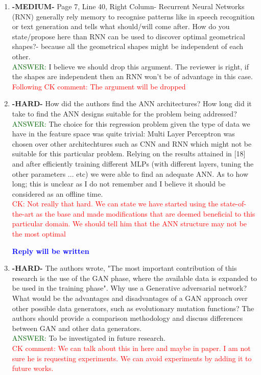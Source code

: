 \documentclass{article}
\newcommand{\reply}{\large \textcolor{blue}{ \textbf{Reply will be written} }}
\begin{document}
\begin{enumerate}
\item \textbf{-MEDIUM-} Page 7, Line 40, Right Column- Recurrent Neural Networks (RNN) generally rely memory to recognise patterns like in speech recognition or text generation and tells what should/will come after. How do you state/propose here than RNN can be used to discover optimal geometrical shapes?- because all the geometrical shapes might be independent of each other. \\
\textcolor{darkgreen}{ANSWER: } I believe we should drop this argument. The reviewer is right, if the shapes are independent then an RNN won't be of advantage in this case. \\

\textcolor{red}{Following CK comment: The argument will be dropped}

\item \textbf{-HARD-} How did the authors find the ANN architectures? How long did it take to find the ANN designs suitable for the problem being addressed? \\
\textcolor{darkgreen}{ANSWER: } The choice for this regression problem given the type of data we have in the feature space was quite trivial: Multi Layer Perceptron was chosen over other architechtures such as CNN and RNN which might not be suitable for this particular problem. Relying on the results attained in [18] and after efficiently training different MLPs (with different layers, tuning the other parameters ... etc) we were able to find an adequate ANN. As to how long; this is unclear as I do not remember and I believe it should be considered as an offline time.\\   

\textcolor{red}{CK: Not really that hard. We can state we have started using the state-of-the-art as the base and made modifications that are deemed beneficial to this particular domain. We should tell him that the ANN structure may not be the most optimal}

\reply

\item \textbf{-HARD-} The authors wrote, "The most important contribution of this research is the use of
the GAN phase, where the available data is expanded to be
used in the training phase". Why use a Generative adversarial network? What would be the advantages and disadvantages of a GAN approach over other possible data generators, such as evolutionary mutation functions? The authors should provide a comparison methodology and discuss differences between GAN and other data generators. \\
\textcolor{darkgreen}{ANSWER: } To be investigated in future research.\\ \textcolor{red}{CK comment: We can talk about this in here and maybe in paper. I am not sure he is requesting experiments. We can avoid experiments by adding it to future works.}



\end{enumerate}
\end{document}

